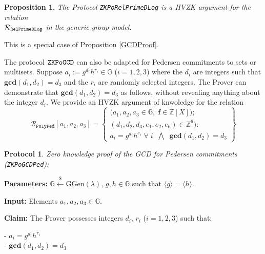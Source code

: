 \documentclass[11pt, lettersize, notitlepage, leqno, footskip=0.6cm]{article}
\newcommand{\bz}{\mathbb Z}
\newcommand{\ttt}{\texttt}
\newcommand{\bG}{\mathbb{G}}
\newcommand{\la}{\langle}
\newcommand{\ra}{\rangle}
\newcommand{\mc}{\mathcal}
\newcommand{\mb}{\mathbb}
\newcommand{\mbf}{\mathbf}
\newcommand{\mr}{\mathrm}
\newcommand{\lamb}{\lambda}
\newcommand{\noin}{\noindent}
\newcommand{\GCD}{\mbf{gcd}}
\newtheorem{Prop}[Thm]{Proposition}
\newtheorem{Prot}[Thm]{Protocol}
\numberwithin{equation}{section}
\begin{document}
\vspace{0.1cm}

\begin{Prop} The Protocol \verb|ZKPoRelPrimeDLog| is a HVZK argument for the relation\\ $\mc{R}_{{\tt{RelPrimeDLog}}}$ in the generic group model.\end{Prop}

\begin{prf} This is a special case of Proposition \ref{GCDProof}.\end{prf}

The protocol $\tt{ZKPoGCD}$ can also be adapted for Pedersen commitments to sets or multisets. Suppose $ a_i:= g^{d_i}h^{r_i}\in \bG $ ($i=1,2,3$) where the $d_i$ are integers such that $\GCD(d_1,d_2) = d_3$ and the $r_i$ are randomly selected integers. The Prover can demonstrate that $\GCD(d_1,d_2) = d_3$ as follows, without revealing anything about the integer $d_i$. We provide an HVZK argument of knwoledge for the relation \[
  \mc{R}_{{\ttt{PolyPed}}}[a_1,a_2,a_3] = \left\{\begin{array}{l}
    \big(a_1,a_2,a_3\in\mb{G},\;\mbf{f}\in\bz[X]\big);\\
    (d_1, d_2,d_3, e_1,e_2, e_6)\in\mb{Z}^6): \\
    a_i = g^{d_i}h^{e_i}\;\forall\; i\;\; \bigwedge\;\; \GCD(d_1,d_2) = d_3  \end{array}\right\}
\] 

\begin{Prot} \normalfont \hypertarget{GCDPedersen}{\textit{Zero knowledge proof of the GCD for Pedersen commitments}} (\verb|ZKPoGCDPed|):\end{Prot} \vspace{-0.3cm}

\noin \textbf{Parameters:} $\mb{G}\xleftarrow{\$} \mr{GGen}(\lamb)$,  $g,h\in \mb{G}$ such that $\la g \ra = \la h \ra$.

\noin \textbf{Input:} Elements $a_1, a_2, a_3\in \mb{G}$.

\noin \textbf{Claim:} The Prover possesses integers $d_i$, $r_i$ ($i=1,2,3$) such that:

\noin - $a_i = g^{d_i}h^{r_i}$\\
\noin - $\GCD(d_1, d_2) = d_3$
\end{document}
